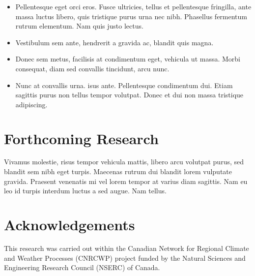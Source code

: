 \documentclass[a0,landscape]{a0poster}
\begin{document}
\begin{multicols*}{3}
\begin{itemize}
\item Pellentesque eget orci eros. Fusce ultricies, tellus et pellentesque fringilla, ante massa luctus libero, quis tristique purus urna nec nibh. Phasellus fermentum rutrum elementum. Nam quis justo lectus.
\item Vestibulum sem ante, hendrerit a gravida ac, blandit quis magna.
\item Donec sem metus, facilisis at condimentum eget, vehicula ut massa. Morbi consequat, diam sed convallis tincidunt, arcu nunc.
\item Nunc at convallis urna. isus ante. Pellentesque condimentum dui. Etiam sagittis purus non tellus tempor volutpat. Donec et dui non massa tristique adipiscing.
\end{itemize}

\color{DarkSlateGray} %


\section*{Forthcoming Research}

Vivamus molestie, risus tempor vehicula mattis, libero arcu volutpat purus, sed blandit sem nibh eget turpis. Maecenas rutrum dui blandit lorem vulputate gravida. Praesent venenatis mi vel lorem tempor at varius diam sagittis. Nam eu leo id turpis interdum luctus a sed augue. Nam tellus.


\nocite{*} %


\section*{Acknowledgements}

This research was carried out within the Canadian Network for Regional Climate and Weather Processes (CNRCWP) project funded by the Natural Sciences and Engineering Research Council (NSERC) of Canada.

\end{multicols*}
\end{document}
